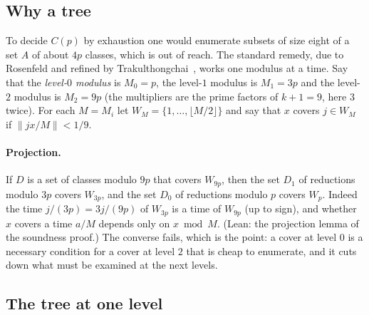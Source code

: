\documentclass[11pt]{article}
\theoremstyle{remark}
\newcommand{\dist}[1]{\lVert #1\rVert}
\begin{document}
\subsection{Why a tree}

To decide $C(p)$ by exhaustion one would enumerate subsets of size eight of a set $A$ of about $4p$ classes, which is out of reach. The standard remedy, due to Rosenfeld and refined by Trakulthongchai~\cite{Tra,ST}, works one modulus at a time. Say that the \emph{level-$0$ modulus} is $M_0=p$, the level-$1$ modulus is $M_1=3p$ and the level-$2$ modulus is $M_2=9p$ (the multipliers are the prime factors of $k+1=9$, here $3$ twice). For each $M=M_i$ let $W_M=\{1,\dots,\lfloor M/2\rfloor\}$ and say that $x$ covers $j\in W_M$ if $\dist{jx/M}<1/9$.

\paragraph{Projection.} If $D$ is a set of classes modulo $9p$ that covers $W_{9p}$, then the set $D_1$ of reductions modulo $3p$ covers $W_{3p}$, and the set $D_0$ of reductions modulo $p$ covers $W_p$. Indeed the time $j/(3p)=3j/(9p)$ of $W_{3p}$ is a time of $W_{9p}$ (up to sign), and whether $x$ covers a time $a/M$ depends only on $x\bmod M$. (Lean: the projection lemma of the soundness proof.) The converse fails, which is the point: a cover at level $0$ is a necessary condition for a cover at level $2$ that is cheap to enumerate, and it cuts down what must be examined at the next levels.

\subsection{The tree at one level}
\end{document}
